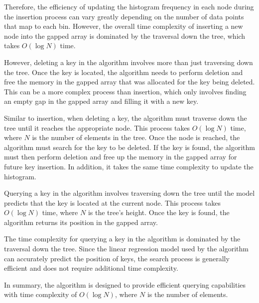Therefore, the efficiency of updating the histogram frequency in each node during the insertion process can vary greatly depending on the number of data points that map to each bin. However, the overall time complexity of inserting a new node into the gapped array is dominated by the traversal down the tree, which takes $O(\log N)$ time.

However, deleting a key in the \learnindex algorithm involves more than just traversing down the tree. Once the key is located, the algorithm needs to perform deletion and free the memory in the gapped array that was allocated for the key being deleted. This can be a more complex process than insertion, which only involves finding an empty gap in the gapped array and filling it with a new key.

Similar to insertion, when deleting a key, the algorithm must traverse down the tree until it reaches the appropriate node. This process takes $O(\log N)$ time, where $N$ is the number of elements in the tree. Once the node is reached, the algorithm must search for the key to be deleted. If the key is found, the algorithm must then perform deletion and free up the memory in the gapped array for future key insertion. In addition, it takes the same time complexity to update the histogram.

Querying a key in the \learnindex algorithm involves traversing down the tree until the model predicts that the key is located at the current node. This process takes $O(\log N)$ time, where $N$ is the tree's height. Once the key is found, the algorithm returns its position in the gapped array.

The time complexity for querying a key in the \learnindex algorithm is dominated by the traversal down the tree. Since the linear regression model used by the algorithm can accurately predict the position of keys, the search process is generally efficient and does not require additional time complexity.

In summary, the \learnindex algorithm is designed to provide efficient querying capabilities with time complexity of $O(\log N)$, where $N$ is the number of elements. 


